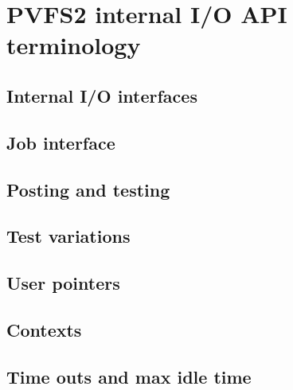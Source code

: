 \section{PVFS2 internal I/O API terminology}

\subsection{Internal I/O interfaces}

\subsection{Job interface}

\subsection{Posting and testing}

\subsection{Test variations}

\subsection{User pointers}

\subsection{Contexts}

\subsection{Time outs and max idle time}

